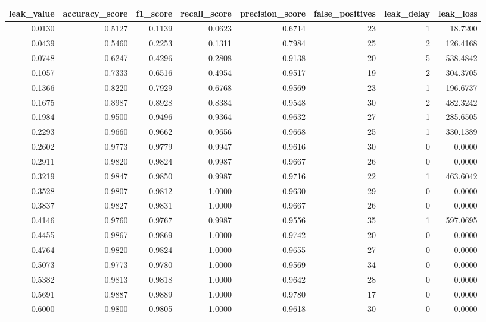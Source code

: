 \begin{tabular}{rrrrrrrr}
\toprule
leak\_value & accuracy\_score & f1\_score & recall\_score & precision\_score & false\_positives & leak\_delay & leak\_loss \\
\midrule
0.0130 & 0.5127 & 0.1139 & 0.0623 & 0.6714 & 23 & 1 & 18.7200 \\
0.0439 & 0.5460 & 0.2253 & 0.1311 & 0.7984 & 25 & 2 & 126.4168 \\
0.0748 & 0.6247 & 0.4296 & 0.2808 & 0.9138 & 20 & 5 & 538.4842 \\
0.1057 & 0.7333 & 0.6516 & 0.4954 & 0.9517 & 19 & 2 & 304.3705 \\
0.1366 & 0.8220 & 0.7929 & 0.6768 & 0.9569 & 23 & 1 & 196.6737 \\
0.1675 & 0.8987 & 0.8928 & 0.8384 & 0.9548 & 30 & 2 & 482.3242 \\
0.1984 & 0.9500 & 0.9496 & 0.9364 & 0.9632 & 27 & 1 & 285.6505 \\
0.2293 & 0.9660 & 0.9662 & 0.9656 & 0.9668 & 25 & 1 & 330.1389 \\
0.2602 & 0.9773 & 0.9779 & 0.9947 & 0.9616 & 30 & 0 & 0.0000 \\
0.2911 & 0.9820 & 0.9824 & 0.9987 & 0.9667 & 26 & 0 & 0.0000 \\
0.3219 & 0.9847 & 0.9850 & 0.9987 & 0.9716 & 22 & 1 & 463.6042 \\
0.3528 & 0.9807 & 0.9812 & 1.0000 & 0.9630 & 29 & 0 & 0.0000 \\
0.3837 & 0.9827 & 0.9831 & 1.0000 & 0.9667 & 26 & 0 & 0.0000 \\
0.4146 & 0.9760 & 0.9767 & 0.9987 & 0.9556 & 35 & 1 & 597.0695 \\
0.4455 & 0.9867 & 0.9869 & 1.0000 & 0.9742 & 20 & 0 & 0.0000 \\
0.4764 & 0.9820 & 0.9824 & 1.0000 & 0.9655 & 27 & 0 & 0.0000 \\
0.5073 & 0.9773 & 0.9780 & 1.0000 & 0.9569 & 34 & 0 & 0.0000 \\
0.5382 & 0.9813 & 0.9818 & 1.0000 & 0.9642 & 28 & 0 & 0.0000 \\
0.5691 & 0.9887 & 0.9889 & 1.0000 & 0.9780 & 17 & 0 & 0.0000 \\
0.6000 & 0.9800 & 0.9805 & 1.0000 & 0.9618 & 30 & 0 & 0.0000 \\
\bottomrule
\end{tabular}
